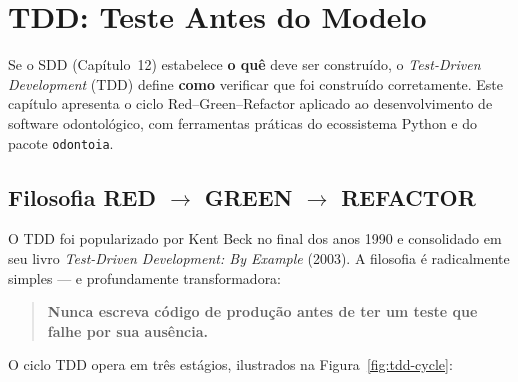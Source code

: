 \chapter{TDD: Teste Antes do Modelo}
\label{cap:tdd-python}
\niveltres

Se o SDD (Capítulo~12) estabelece \textbf{o quê} deve ser construído,
o \textit{Test-Driven Development} (TDD) define \textbf{como} verificar
que foi construído corretamente. Este capítulo apresenta o ciclo
Red--Green--Refactor aplicado ao desenvolvimento de software odontológico,
com ferramentas práticas do ecossistema Python e do pacote \texttt{odontoia}.

\section{Filosofia RED $\rightarrow$ GREEN $\rightarrow$ REFACTOR}

O TDD foi popularizado por Kent Beck no final dos anos 1990 e consolidado
em seu livro \textit{Test-Driven Development: By Example} (2003). A
filosofia é radicalmente simples — e profundamente transformadora:

\begin{quote}
  \textbf{Nunca escreva código de produção antes de ter um teste que
  falhe por sua ausência.}
\end{quote}

 

O ciclo TDD opera em três estágios, ilustrados na Figura~\ref{fig:tdd-cycle}:

